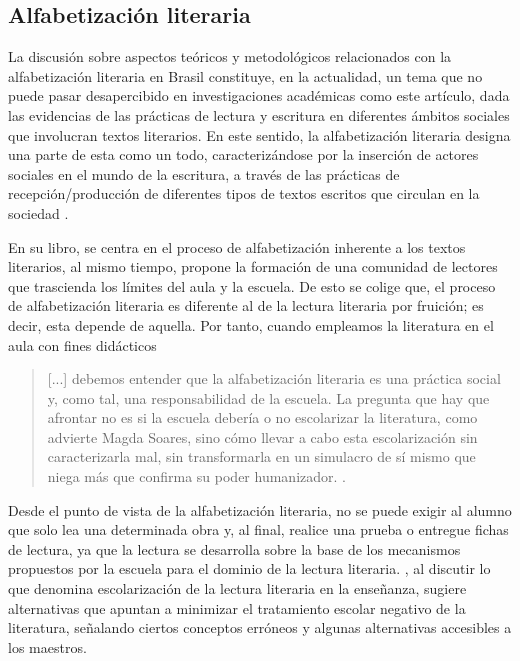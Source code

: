 \documentclass{textolivre}
\begin{document}
\subsection{Alfabetización literaria}\label{sec-literaria}
La discusión sobre aspectos teóricos y metodológicos relacionados con la alfabetización literaria en Brasil constituye, en la actualidad, un tema que no puede pasar desapercibido en investigaciones académicas como este artículo, dada las evidencias de las prácticas de lectura y escritura en diferentes ámbitos sociales que involucran textos literarios. En este sentido, la alfabetización literaria designa una parte de esta como un todo, caracterizándose por la inserción de actores sociales en el mundo de la escritura, a través de las prácticas de recepción/producción de diferentes tipos de textos escritos que circulan en la sociedad \cite{paulino_letramento_2001}. 

En su libro, \textcite{cosson_letramento_2009} se centra en el proceso de alfabetización inherente a los textos literarios, al mismo tiempo, propone la formación de una comunidad de lectores que trascienda los límites del aula y la escuela. De esto se colige que, el proceso de alfabetización literaria es diferente al de la lectura literaria por fruición; es decir, esta depende de aquella. Por tanto, cuando empleamos la literatura en el aula con fines didácticos

\begin{quote}
    [...] debemos entender que la alfabetización literaria es una práctica social y, como tal, una responsabilidad de la escuela. La pregunta que hay que afrontar no es si la escuela debería o no escolarizar la literatura, como advierte Magda Soares, sino cómo llevar a cabo esta escolarización sin caracterizarla mal, sin transformarla en un simulacro de sí mismo que niega más que confirma su poder humanizador. \cite[p. 23]{cosson_letramento_2009}. 
\end{quote}

Desde el punto de vista de la alfabetización literaria, no se puede exigir al alumno que solo lea una determinada obra y, al final, realice una prueba o entregue fichas de lectura, ya que la lectura se desarrolla sobre la base de los mecanismos propuestos por la escuela para el dominio de la lectura literaria. \textcite{cosson_letramento_2009}, al discutir lo que denomina escolarización de la lectura literaria en la enseñanza, sugiere alternativas que apuntan a minimizar el tratamiento escolar negativo de la literatura, señalando ciertos conceptos erróneos y algunas alternativas accesibles a los maestros. 
\end{document}
